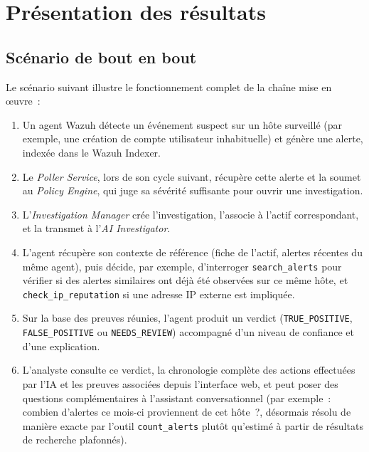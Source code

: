 \chapter{Présentation des résultats}
\label{chap:resultats}

\section{Scénario de bout en bout}

Le scénario suivant illustre le fonctionnement complet de la chaîne mise en
œuvre~:

\begin{enumerate}
  \item Un agent Wazuh détecte un événement suspect sur un hôte surveillé
        (par exemple, une création de compte utilisateur inhabituelle) et
        génère une alerte, indexée dans le Wazuh Indexer.
  \item Le \textit{Poller Service}, lors de son cycle suivant, récupère
        cette alerte et la soumet au \textit{Policy Engine}, qui juge sa
        sévérité suffisante pour ouvrir une investigation.
  \item L'\textit{Investigation Manager} crée l'investigation, l'associe à
        l'actif correspondant, et la transmet à l'\textit{AI Investigator}.
  \item L'agent récupère son contexte de référence (fiche de l'actif,
        alertes récentes du même agent), puis décide, par exemple,
        d'interroger \texttt{search\_alerts} pour vérifier si des alertes
        similaires ont déjà été observées sur ce même hôte, et
        \texttt{check\_ip\_reputation} si une adresse IP externe est
        impliquée.
  \item Sur la base des preuves réunies, l'agent produit un verdict
        (\texttt{TRUE\_POSITIVE}, \texttt{FALSE\_POSITIVE} ou
        \texttt{NEEDS\_REVIEW}) accompagné d'un niveau de confiance et
        d'une explication.
  \item L'analyste consulte ce verdict, la chronologie complète des actions
        effectuées par l'IA et les preuves associées depuis l'interface
        web, et peut poser des questions complémentaires à l'assistant
        conversationnel (par exemple~: \og combien d'alertes ce mois-ci
        proviennent de cet hôte~?\fg{}, désormais résolu de manière exacte
        par l'outil \texttt{count\_alerts} plutôt qu'estimé à partir de
        résultats de recherche plafonnés).
\end{enumerate}

